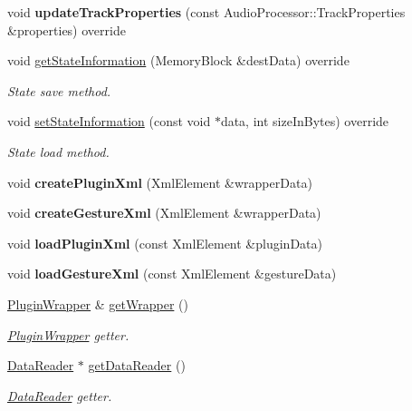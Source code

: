 \begin{DoxyCompactItemize}
void {\bfseries update\+Track\+Properties} (const Audio\+Processor\+::\+Track\+Properties \&properties) override
\item 
void \mbox{\hyperlink{class_plume_processor_ae06dd312c3dc3ba7389ce44fd74cbc18}{get\+State\+Information}} (Memory\+Block \&dest\+Data) override
\begin{DoxyCompactList}\small\item\em State save method. \end{DoxyCompactList}\item 
void \mbox{\hyperlink{class_plume_processor_aa7ab9da73c37f6db69ea6c7e1e4a0211}{set\+State\+Information}} (const void $\ast$data, int size\+In\+Bytes) override
\begin{DoxyCompactList}\small\item\em State load method. \end{DoxyCompactList}\item 
\mbox{\label{class_plume_processor_ad29b07ddcd526e44529e361374c8c99e}} 
void {\bfseries create\+Plugin\+Xml} (Xml\+Element \&wrapper\+Data)
\item 
\mbox{\label{class_plume_processor_a14455799e2ddefd50b860d4492845509}} 
void {\bfseries create\+Gesture\+Xml} (Xml\+Element \&wrapper\+Data)
\item 
\mbox{\label{class_plume_processor_a08587fb2663557a8250132502785205c}} 
void {\bfseries load\+Plugin\+Xml} (const Xml\+Element \&plugin\+Data)
\item 
\mbox{\label{class_plume_processor_a988e2a3ce47486bd8dfc5d5702420a7e}} 
void {\bfseries load\+Gesture\+Xml} (const Xml\+Element \&gesture\+Data)
\item 
\mbox{\hyperlink{class_plugin_wrapper}{Plugin\+Wrapper}} \& \mbox{\hyperlink{class_plume_processor_a6ec4d89f181beea78034b81911c59aa8}{get\+Wrapper}} ()
\begin{DoxyCompactList}\small\item\em \mbox{\hyperlink{class_plugin_wrapper}{Plugin\+Wrapper}} getter. \end{DoxyCompactList}\item 
\mbox{\hyperlink{class_data_reader}{Data\+Reader}} $\ast$ \mbox{\hyperlink{class_plume_processor_ab24c4b6857ca26d462fce6be9e23cedd}{get\+Data\+Reader}} ()
\begin{DoxyCompactList}\small\item\em \mbox{\hyperlink{class_data_reader}{Data\+Reader}} getter. \end{DoxyCompactList}\item 

\end{DoxyCompactItemize}

